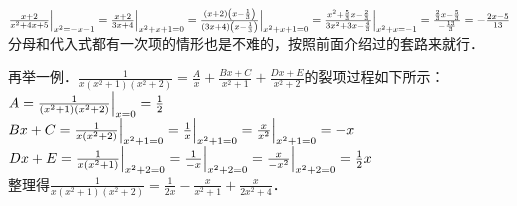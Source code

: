 \documentclass{ctexbook}
\begin{document}
$\frac{x+2}{x^{2}+4x+5}\Big{|}_{x^{2}=-x-1}=\frac{x+2}{3x+4}\Big{|}_{x^{2}+x+1=0}=\frac{\left(x+2\right)\left(x-\frac{1}{3}\right)}{\left(3x+4\right)\left(x-\frac{1}{3}\right)}\Big{|}_{x^{2}+x+1=0}=\frac{x^{2}+\frac{5}{3}x-\frac{2}{3}}{3x^{2}+3x-\frac{4}{3}}\Big{|}_{x^{2}+x=-1}=\frac{\frac{2}{3}x-\frac{5}{3}}{-\frac{13}{3}}=-\frac{2x-5}{13}$\\
分母和代入式都有一次项的情形也是不难的，按照前面介绍过的套路来就行．\par
再举一例．$\frac{1}{x\left(x^{2}+1\right)\left(x^{2}+2\right)}=\frac{A}{x}+\frac{Bx+C}{x^{2}+1}+\frac{Dx+E}{x^{2}+2}$的裂项过程如下所示：\\
$A=\frac{1}{\left(x^{2}+1\right)\left(x^{2}+2\right)}\Big{|}_{x=0}=\frac{1}{2}$\\
$Bx+C=\frac{1}{x\left(x^{2}+2\right)}\Big{|}_{x^{2}+1=0}=\frac{1}{x}\Big{|}_{x^{2}+1=0}=\frac{x}{x^{2}}\Big{|}_{x^{2}+1=0}=-x$\\
$Dx+E=\frac{1}{x\left(x^{2}+1\right)}\Big{|}_{x^{2}+2=0}=\frac{1}{-x}\Big{|}_{x^{2}+2=0}=\frac{x}{-x^{2}}\Big{|}_{x^{2}+2=0}=\frac{1}{2}x$\\
整理得$\frac{1}{x\left(x^{2}+1\right)\left(x^{2}+2\right)}=\frac{1}{2x}-\frac{x}{x^{2}+1}+\frac{x}{2x^{2}+4}$．\par
\end{document}
